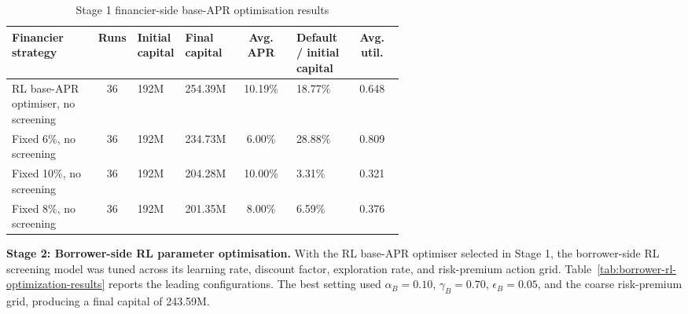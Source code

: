 \documentclass[12pt]{article}
\begin{document}
\begin{table}[H]
	\centering
	\caption{Stage 1 financier-side base-APR optimisation results}
	\label{tab:financier-rl-optimization-results}
	\small
	\setlength{\tabcolsep}{2pt}
	\renewcommand{\arraystretch}{1.12}
	\begin{tabular}{|C{0.22\linewidth}|c|C{0.11\linewidth}|C{0.11\linewidth}|c|C{0.14\linewidth}|c|}
		\hline
		\textbf{Financier strategy} & \textbf{Runs} & \textbf{Initial capital} & \textbf{Final capital} & \textbf{Avg. APR} & \textbf{Default / initial capital} & \textbf{Avg. util.} \\
		\hline
		RL base-APR optimiser, no screening & 36 & 192M & 254.39M & 10.19\% & 18.77\% & 0.648 \\
		\hline
		Fixed 6\%, no screening & 36 & 192M & 234.73M & 6.00\% & 28.88\% & 0.809 \\
		\hline
		Fixed 10\%, no screening & 36 & 192M & 204.28M & 10.00\% & 3.31\% & 0.321 \\
		\hline
		Fixed 8\%, no screening & 36 & 192M & 201.35M & 8.00\% & 6.59\% & 0.376 \\
		\hline
	\end{tabular}
\end{table}


\textbf{Stage 2: Borrower-side RL parameter optimisation.} With the RL base-APR optimiser selected in Stage 1, the borrower-side RL screening model was tuned across its learning rate, discount factor, exploration rate, and risk-premium action grid. Table~\ref{tab:borrower-rl-optimization-results} reports the leading configurations. The best setting used \(\alpha_B=0.10\), \(\gamma_B=0.70\), \(\epsilon_B=0.05\), and the coarse risk-premium grid, producing a final capital of 243.59M.
	
\end{document}
